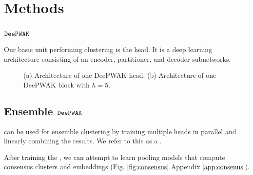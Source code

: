 \section{Methods}

\subsection{$\mathop{\mathtt{DeePWAK}}\limits$}

Our basic unit performing clustering is the \DeePWAK head.
It is a deep learning architecture consisting of an encoder, partitioner, and decoder subnetworks.


\begin{figure}
     \begin{subfigure}[b]{0.5\textwidth}
        
         \caption{}
         \label{fig:}
     \end{subfigure}
     \hfill
     \begin{subfigure}[b]{\textwidth}
        
         \caption{}
         \label{fig:}
     \end{subfigure}

     \caption{
       (a) Architecture of one DeePWAK head.
       (b) Architecture of one DeePWAK block with $h=5$.}
     \label{fig:}
\end{figure}
  
\subsection{Ensemble $\mathop{\mathtt{DeePWAK}}\limits$}

\DeePWAK can be used for ensemble clustering by training multiple heads in parallel and linearly combining the results. We refer to this as a \DeePWAKBlock.

After training the \DeePWAKBlock, we can attempt to learn pooling models that compute consensus clusters and embeddings (Fig. \ref{fig:consensus} Appendix \ref{app:consenus}).

